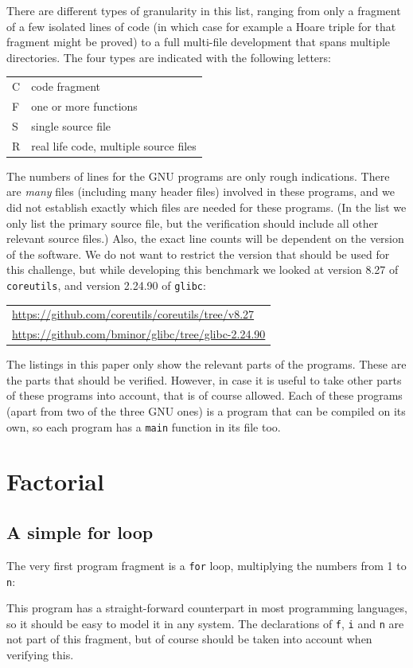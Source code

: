 \documentclass{article}
\begin{document}
\noindent
There are different types of granularity in this list, ranging from only a fragment of a few isolated lines of code
(in which case for example a Hoare triple for that fragment might be proved) to a full multi-file development that spans multiple directories.
The four types are indicated with the following letters:
\begin{center}
\begin{tabular}{ll}
C & code fragment \\
F & one or more functions \\
S & single source file \\
R & real life code, multiple source files
\end{tabular}
\end{center}
The numbers of lines for the GNU programs are only rough indications.
There are \emph{many} files (including many header files) involved in these
programs, and we did not establish exactly which files are needed for
these programs.
(In the list we only list the primary source file, but the verification should
include all other relevant source files.)
Also, the exact line counts will be dependent on the version of the
software.
We do not want to restrict the version that should be used for this
challenge, but while developing this benchmark we looked at version
8.27 of \texttt{coreutils}, and version 2.24.90 of \texttt{glibc}:
\begin{center}
\begin{tabular}{l}
\url{https://github.com/coreutils/coreutils/tree/v8.27} \\
\url{https://github.com/bminor/glibc/tree/glibc-2.24.90}
\end{tabular}
\end{center}
The listings in this paper only show the relevant parts of the programs.
These are the parts that should be verified.
However, in case it is useful to take other parts of these programs into
account, that is of course allowed.
Each of these programs (apart from two of the three GNU ones) is a program that can be compiled on its own,
so each program has a \texttt{main} function in its file too.

\section{Factorial}\label{fac}

\subsection{A simple for loop}
The very first program fragment is a \texttt{for} loop,
multiplying the numbers from 1 to \texttt{n}:

This program has a straight-forward counterpart in most
programming languages, so it should be easy to model it in any
system.
The declarations of \texttt{f}, \texttt{i} and \texttt{n} are not part of this
fragment, but of course should be taken into account when verifying this.
\end{document}
